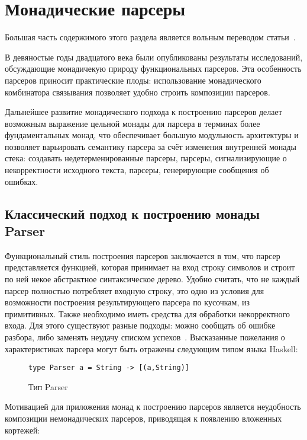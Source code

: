 \section{Монадические парсеры}

Большая часть содержимого этого раздела является вольным переводом статьи~\autocite{MonParsing}.

В девяностые годы двадцатого века были опубликованы результаты исследований, обсуждающие монадичекую природу функциональных парсеров. Эта особенность парсеров приносит практические плоды: использование монадического комбинатора связывания позволяет удобно строить композиции парсеров. 

Дальнейшее развитие монадического подхода к построению парсеров делает возможным выражение цельной монады для парсера в терминах более фундаментальных монад, что обеспечивает большую модульность архитектуры и позволяет варьировать семантику парсера за счёт изменения внутренней монады стека: создавать недетерменированные парсеры, парсеры, сигнализирующие о некорректности исходного текста, парсеры, генерирующие сообщения об ошибках.

\subsection{Классический подход к построению монады Parser}

Функциональный стиль построения парсеров заключается в том, что парсер представляется функцией, которая принимает на вход строку символов и строит по ней некое абстрактное синтаксическое дерево. Удобно считать, что не каждый парсер полностью потребляет входную строку, это одно из условия для возможности построения результирующего парсера по кусочкам, из примитивных. Также необходимо иметь средства для обработки некорректного входа. Для этого существуют разные подходы: можно сообщать об ошибке разбора, либо заменять неудачу списком успехов~\autocite{WadlerSuccess}. Высказанные пожелания о характеристиках парсера могут быть отражены следующим типом языка Haskell: 

\begin{figure}[h]
\begin{lstlisting}
type Parser a = String -> [(a,String)]
\end{lstlisting}
\caption{Тип Parser}
\end{figure}

Мотивацией для приложения монад к построению парсеров является неудобность композиции немонадических парсеров, приводящая к появлению вложенных кортежей: 

